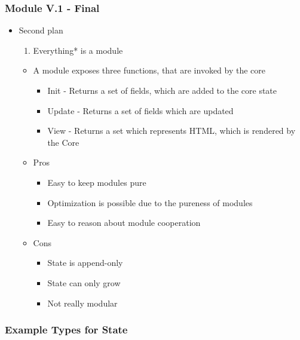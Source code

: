 \begin{frame}
  \frametitle{Module V.1 - Final}
  \begin{itemize}
    \item Second plan
      \pause
      \begin{enumerate}
        \item Everything* is a module
      \end{enumerate}
      \pause
      \begin{itemize}
        \item A module exposes three functions, that are invoked by the core
          \pause
          \begin{itemize}
            \item Init - Returns a set of fields, which are added to the core state
              \pause
            \item Update - Returns a set of fields which are updated
              \pause
            \item View - Returns a set which represents HTML, which is rendered by
              the Core
          \end{itemize}
          \pause
        \item Pros
          \pause
          \begin{itemize}
            \item Easy to keep modules pure
              \pause
            \item Optimization is possible due to the pureness of modules
              \pause
            \item Easy to reason about module cooperation
          \end{itemize}
          \pause
        \item Cons
          \pause
          \begin{itemize}
            \item State is append-only
              \pause
            \item State can only grow
              \pause
            \item Not really modular
          \end{itemize}
      \end{itemize}
  \end{itemize}
\end{frame}

\begin{frame}
  \frametitle{Example Types for State}
  
\end{frame}

